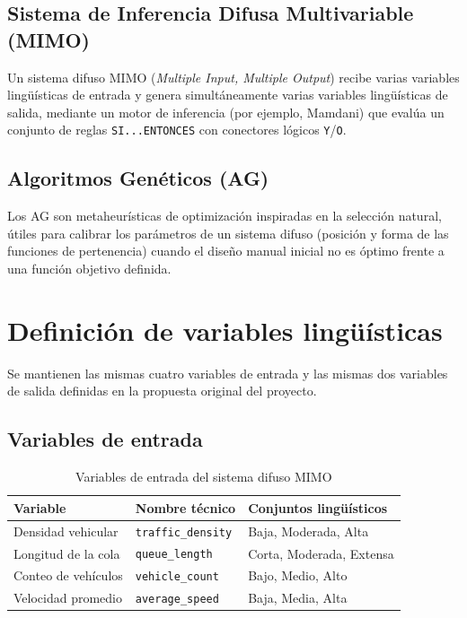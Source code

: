 \documentclass[12pt,a4paper]{article}
\begin{document}
\subsection{Sistema de Inferencia Difusa Multivariable (MIMO)}

Un sistema difuso MIMO (\textit{Multiple Input, Multiple Output}) recibe
varias variables lingüísticas de entrada y genera simultáneamente varias
variables lingüísticas de salida, mediante un motor de inferencia (por
ejemplo, Mamdani) que evalúa un conjunto de reglas \texttt{SI...ENTONCES}
con conectores lógicos \texttt{Y}/\texttt{O}.

\subsection{Algoritmos Genéticos (AG)}

Los AG son metaheurísticas de optimización inspiradas en la selección
natural, útiles para calibrar los parámetros de un sistema difuso
(posición y forma de las funciones de pertenencia) cuando el diseño
manual inicial no es óptimo frente a una función objetivo definida.


\section{Definición de variables lingüísticas}

Se mantienen las mismas cuatro variables de entrada y las mismas dos
variables de salida definidas en la propuesta original del proyecto.

\subsection{Variables de entrada}

\begin{table}[H]
\centering
\caption{Variables de entrada del sistema difuso MIMO}
\begin{tabular}{lll}
\toprule
\textbf{Variable} & \textbf{Nombre técnico} & \textbf{Conjuntos lingüísticos} \\
\midrule
Densidad vehicular & \texttt{traffic\_density} & Baja, Moderada, Alta \\
Longitud de la cola & \texttt{queue\_length} & Corta, Moderada, Extensa \\
Conteo de vehículos & \texttt{vehicle\_count} & Bajo, Medio, Alto \\
Velocidad promedio & \texttt{average\_speed} & Baja, Media, Alta \\
\bottomrule
\end{tabular}
\end{table}
\end{document}
